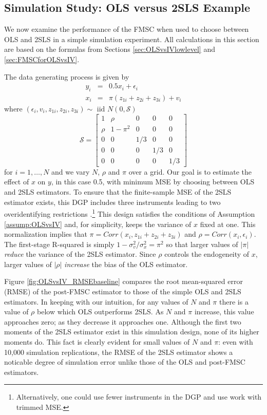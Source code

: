 \subsection{Simulation Study: OLS versus 2SLS Example}
\label{sec:OLSvsIVsim}
We now examine the performance of the FMSC when used to choose between OLS and 2SLS in a simple simulation experiment. 
All calculations in this section are based on the formulas from Sections
\ref{sec:OLSvsIVlowlevel} and \ref{sec:FMSCforOLSvsIV}. 

The data generating process is given by 
\begin{eqnarray}
	y_i &=& 0.5 x_i + \epsilon_i\\
	x_i &=& \pi(z_{1i} + z_{2i} + z_{3i}) + v_i
\end{eqnarray}
where $(\epsilon_i, v_i, z_{1i}, z_{2i}, z_{3i}) \sim \mbox{ iid } N(0, \mathcal{S})$
\begin{equation}
	\mathcal{S} = \left[ \begin{array}
		{ccccc} 
		1 & \rho & 0 & 0 & 0\\
		\rho & 1 - \pi^2 & 0 & 0 & 0\\
		0 & 0 & 1/3 & 0 & 0\\
		0 & 0 & 0 & 1/3 & 0 \\
		0 & 0 & 0 & 0 & 1/3
	\end{array}\right]
\end{equation}
for $i= 1, \hdots, N$ and we vary $N$, $\rho$ and $\pi$ over a grid.
Our goal is to estimate the effect of $x$ on $y$, in this case 0.5, with minimum MSE by choosing between OLS and 2SLS estimators.
To ensure that the finite-sample MSE of the 2SLS estimator exists, this DGP includes three instruments leading to two overidentifying restrictions \citep{Phillips1980}.\footnote{Alternatively, one could use fewer instruments in the DGP and use work with trimmed MSE.}
This design satisfies the conditions of Assumption \ref{assump:OLSvsIV} and, for simplicity, keeps the variance of $x$ fixed at one.
This normalization implies that $\pi = Corr(x_i, z_{1i} + z_{2i} + z_{3i})$ and $\rho = Corr(x_i,\epsilon_i)$.
The first-stage R-squared is simply $1 - \sigma_v^2/\sigma_x^2 = \pi^2$ so that larger values of $|\pi|$ \emph{reduce} the variance of the 2SLS estimator.
Since $\rho$ controls the endogeneity of $x$, larger values of $|\rho|$ \emph{increase} the bias of the OLS estimator.

Figure \ref{fig:OLSvsIV_RMSEbaseline} compares the root mean-squared error (RMSE) of the post-FMSC estimator to those of the simple OLS and 2SLS estimators.
In keeping with our intuition, for any values of $N$ and $\pi$ there is a value of $\rho$ below which OLS outperforms 2SLS. 
As $N$ and $\pi$ increase, this value approaches zero; as they decrease it approaches one.
Although the first two moments of the 2SLS estimator exist in this simulation design, none of its higher moments do. 
This fact is clearly evident for small values of $N$ and $\pi$: even with 10,000 simulation replications, the RMSE of the 2SLS estimator shows a noticable degree of simulation error unlike those of the OLS and post-FMSC estimators.

